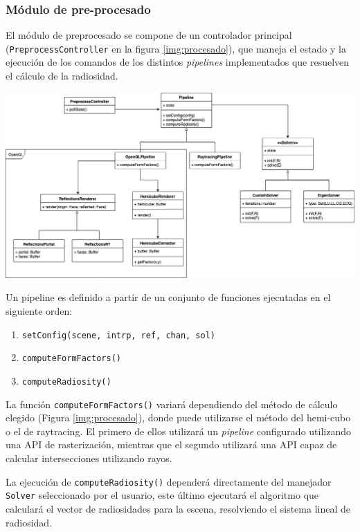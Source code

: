 \subsubsection{Módulo de pre-procesado}

El módulo de preprocesado se compone de un controlador principal (\verb|PreprocessController| en la figura \ref{img:procesado}), que maneja el estado y la ejecución de  los comandos de los distintos \textit{pipelines} implementados que resuelven el cálculo de la radiosidad.

\vspace{5mm}
\begin{minipage}[h]{\linewidth}
	\centering
	\includegraphics[width=\linewidth]{assets/preprocess}
	\label{img:procesado}
\end{minipage}

Un pipeline es definido a partir de un conjunto de funciones ejecutadas en el siguiente orden:

\begin{enumerate}
	\item \verb|setConfig(scene, intrp, ref, chan, sol)|
	\item \verb|computeFormFactors()|
	\item \verb|computeRadiosity()|
\end{enumerate}

La función \verb|computeFormFactors()| variará dependiendo del método de cálculo elegido (Figura \ref{img:procesado}), donde puede utilizarse el método del hemi-cubo o el de raytracing. El primero de ellos utilizará un \textit{pipeline} configurado utilizando una API de rasterización, mientras que el segundo utilizará una API capaz de calcular intersecciones utilizando rayos.

La ejecución de \verb|computeRadiosity()| dependerá directamente del manejador \verb|Solver| seleccionado por el usuario, este último ejecutará el algoritmo que calculará el vector de radiosidades para la escena, resolviendo el sistema lineal de radiosidad.

